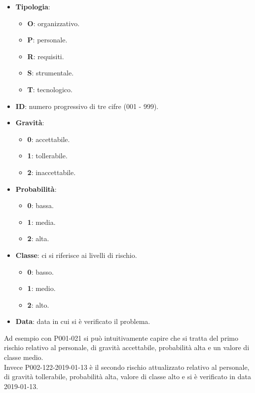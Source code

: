 			\begin{itemize}
				\item \textbf{Tipologia}:
				\begin{itemize}
					\item \textbf{O}: organizzativo.
					\item \textbf{P}: personale.
					\item \textbf{R}: requisiti.
					\item \textbf{S}: strumentale.
					\item \textbf{T}: tecnologico.
				\end{itemize}
				\item \textbf{ID}: numero progressivo di tre cifre (001 - 999).
				\item \textbf{Gravità}:
				\begin{itemize}
					\item \textbf{0}: accettabile.
					\item \textbf{1}: tollerabile.
					\item \textbf{2}: inaccettabile.
				\end{itemize}

				\item \textbf{Probabilità}:
				\begin{itemize}
					\item \textbf{0}: bassa.
					\item \textbf{1}: media.
					\item \textbf{2}: alta.
				\end{itemize}

				\item \textbf{Classe}: ci si riferisce ai livelli di rischio.
				\begin{itemize}
					\item \textbf{0}: basso.
					\item \textbf{1}: medio.
					\item \textbf{2}: alto.
				\end{itemize}
				
				\item \textbf{Data}: data in cui si è verificato il problema.
			\end{itemize}

			Ad esempio con P001-021 si può intuitivamente capire che si tratta del primo rischio relativo al personale, di gravità accettabile,
			probabilità alta e un valore di classe medio.\\
			Invece P002-122-2019-01-13 è il secondo rischio attualizzato relativo al personale, di gravità tollerabile, probabilità alta, valore di classe alto e si è verificato in data 2019-01-13.

